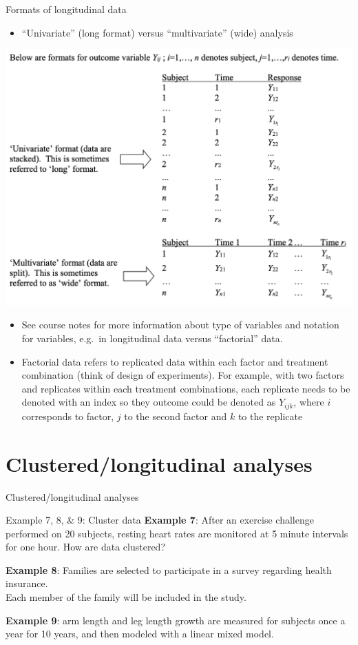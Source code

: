 \documentclass[
  9pt,
  ignorenonframetext,
]{beamer}
\providecommand{\tightlist}{%
  \setlength{\itemsep}{0pt}\setlength{\parskip}{0pt}}
\begin{document}
\begin{frame}{Formats of longitudinal data}
\begin{itemize}
\tightlist
\item
  ``Univariate'' (long format) versus ``multivariate'' (wide) analysis
\end{itemize}

\tiny

\begin{center}\includegraphics[width=0.6\linewidth]{figs_L1/Fig-L1-formats} \end{center}

\tiny

\begin{itemize}
\tightlist
\item
  See course notes for more information about type of variables and
  notation for variables, e.g.~in longitudinal data versus ``factorial''
  data.
\item
  Factorial data refers to replicated data within each factor and
  treatment combination (think of design of experiments). For example,
  with two factors and replicates within each treatment combinations,
  each replicate needs to be denoted with an index so they outcome could
  be denoted as \(Y_{ijk}\), where \(i\) corresponds to factor, \(j\) to
  the second factor and \(k\) to the replicate
\end{itemize}
\end{frame}

\hypertarget{clusteredlongitudinal-analyses}{%
\section{Clustered/longitudinal
analyses}\label{clusteredlongitudinal-analyses}}

\begin{frame}{Clustered/longitudinal analyses}
\begin{block}{Example 7, 8, \& 9: Cluster data}
\protect\hypertarget{example-7-8-9-cluster-data}{}
\textbf{Example 7}: After an exercise challenge performed on 20
subjects, resting heart rates are monitored at 5 minute intervals for
one hour. How are data clustered?

\textbf{Example 8}: Families are selected to participate in a survey
regarding health insurance.\\
Each member of the family will be included in the study.

\textbf{Example 9}: arm length and leg length growth are measured for
subjects once a year for 10 years, and then modeled with a linear mixed
model.
\end{block}
\end{frame}
\end{document}
